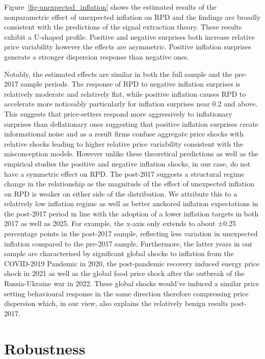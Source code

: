 \documentclass[
  letterpaper,
  DIV=11,
  numbers=noendperiod]{scrartcl}
\begin{document}
Figure~\ref{fig-unexpected_inflation} shows the estimated results of the
nonparametric effect of unexpected inflation on RPD and the findings are
broadly consistent with the predictions of the signal extraction theory.
These results exhibit a U-shaped profile. Positive and negative
surprises both increase relative price variability however the effects
are asymmetric. Positive inflation surprises generate a stronger
dispersion response than negative ones.

Notably, the estimated effects are similar in both the full sample and
the pre-2017 sample periods. The response of RPD to negative inflation
surprises is relatively moderate and relatively flat, while positive
inflation causes RPD to accelerate more noticeably particularly for
inflation surprises near 0.2 and above. This suggests that price-setters
respond more aggressively to inflationary surprises than deflationary
ones suggesting that positive inflation surprises create informational
noise and as a result firms confuse aggregate price shocks with relative
shocks leading to higher relative price variability consistent with the
misconception models. However unlike these theoretical predictions as
well as the empirical studies
\citep{caraballo2013, becker2012, sara-zaror2024} the positive and
negative inflation shocks, in our case, do not have a symmetric effect
on RPD. The post-2017 suggests a structural regime change in the
relationship as the magnitude of the effect of unexpected inflation on
RPD is weaker on either side of the distribution. We attribute this to a
relatively low inflation regime as well as better anchored inflation
expectations \citep{durand2023} in the post-2017 period in line with the
adoption of a lower inflation targets in both 2017 as well as 2025. For
example, the x-axis only extends to about ±0.25 percentage points in the
post-2017 sample, reflecting less variation in unexpected inflation
compared to the pre-2017 sample. Furthermore, the latter years in our
sample are characterised by significant global shocks to inflation from
the COVID-2019 Pandemic in 2020, the post-pandemic recovery induced
energy price shock in 2021 as well as the global food price shock after
the outbreak of the Russia-Ukraine war in 2022. These global shocks
would've induced a similar price setting behavioural response in the
same direction therefore compressing price dispersion
\citep{nakamura2018} which, in our view, also explains the relatively
benign results post-2017.

\section{Robustness}\label{robustness}
\end{document}
